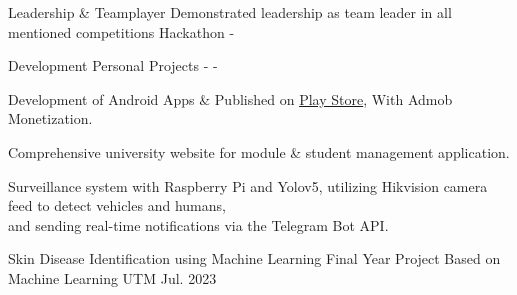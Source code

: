 
\begin{cventries}


  \cventry
    {Leadership \& Teamplayer} %
    {Demonstrated leadership as team leader in all mentioned competitions} %
    {Hackathon} %
    {-} %
    {}

  \cventry
    {Development} %
    {Personal Projects} %
    {-} %
    {-} %
    {
      \begin{cvitems} %
        \item {Development of Android Apps \& Published on \href{https://play.google.com/store/apps/developer?id=AdityaDEV}{\color{ao}Play Store}, With Admob Monetization.}
        \item {Comprehensive university website for module \& student management application.}
        \item {Surveillance system with Raspberry Pi and Yolov5, utilizing Hikvision camera feed to detect vehicles and humans,\\ and sending real-time notifications via the Telegram Bot API.}
      \end{cvitems}
    }

  \cventry
    {Skin Disease Identification using Machine Learning} %
    {Final Year Project Based on Machine Learning} %
    {UTM} %
    {Jul. 2023} %
    {}



\end{cventries}
